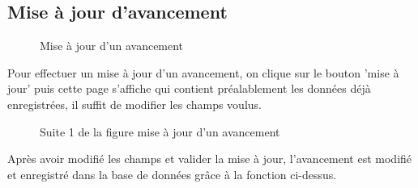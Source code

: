 \documentclass[a4paper]{report}
\begin{document}
\subsection{Mise à jour d'avancement}
\begin{figure}[H]
	\begin{center}
		\caption{Mise à jour d'un avancement}
	\end{center}
\end{figure}
Pour effectuer un mise à jour d'un avancement, on clique sur le bouton 'mise à jour' puis cette page s'affiche qui contient préalablement les données déjà enregistrées, il suffit de modifier les champs voulus.
\begin{figure}[H]
	\begin{center}
		\caption{Suite 1 de la figure mise à jour d'un avancement}
	\end{center}
\end{figure}
Après avoir modifié les champs et valider la mise à jour, l'avancement est modifié et enregistré dans la base de données grâce à la fonction ci-dessus.
\end{document}
